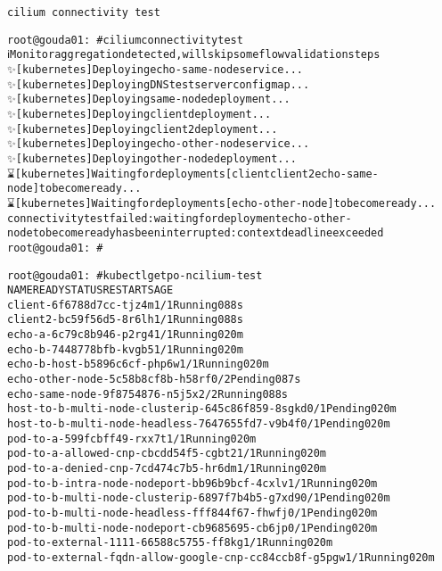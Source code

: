 \documentclass[Screen16to9,17pt]{foils}
\begin{document}

\verb+cilium connectivity test+



\begin{alltt}
root@gouda01:~# cilium connectivity test
ℹ️  Monitor aggregation detected, will skip some flow validation steps
✨ [kubernetes] Deploying echo-same-node service...
✨ [kubernetes] Deploying DNS test server configmap...
✨ [kubernetes] Deploying same-node deployment...
✨ [kubernetes] Deploying client deployment...
✨ [kubernetes] Deploying client2 deployment...
✨ [kubernetes] Deploying echo-other-node service...
✨ [kubernetes] Deploying other-node deployment...
⌛ [kubernetes] Waiting for deployments [client client2 echo-same-node] to become ready...
⌛ [kubernetes] Waiting for deployments [echo-other-node] to become ready...
connectivity test failed: waiting for deployment echo-other-node to become ready has been interrupted: context deadline exceeded
root@gouda01:~#
\end{alltt}

\begin{alltt}
root@gouda01:~# kubectl get po -n cilium-test
NAME                                                    READY   STATUS    RESTARTS   AGE
client-6f6788d7cc-tjz4m                                 1/1     Running   0          88s
client2-bc59f56d5-8r6lh                                 1/1     Running   0          88s
echo-a-6c79c8b946-p2rg4                                 1/1     Running   0          20m
echo-b-7448778bfb-kvgb5                                 1/1     Running   0          20m
echo-b-host-b5896c6cf-php6w                             1/1     Running   0          20m
echo-other-node-5c58b8cf8b-h58rf                        0/2     Pending   0          87s
echo-same-node-9f8754876-n5j5x                          2/2     Running   0          88s
host-to-b-multi-node-clusterip-645c86f859-8sgkd         0/1     Pending   0          20m
host-to-b-multi-node-headless-7647655fd7-v9b4f          0/1     Pending   0          20m
pod-to-a-599fcbff49-rxx7t                               1/1     Running   0          20m
pod-to-a-allowed-cnp-cbcdd54f5-cgbt2                    1/1     Running   0          20m
pod-to-a-denied-cnp-7cd474c7b5-hr6dm                    1/1     Running   0          20m
pod-to-b-intra-node-nodeport-bb96b9bcf-4cxlv            1/1     Running   0          20m
pod-to-b-multi-node-clusterip-6897f7b4b5-g7xd9          0/1     Pending   0          20m
pod-to-b-multi-node-headless-fff844f67-fhwfj            0/1     Pending   0          20m
pod-to-b-multi-node-nodeport-cb9685695-cb6jp            0/1     Pending   0          20m
pod-to-external-1111-66588c5755-ff8kg                   1/1     Running   0          20m
pod-to-external-fqdn-allow-google-cnp-cc84ccb8f-g5pgw   1/1     Running   0          20m
\end{alltt}
\end{document}
